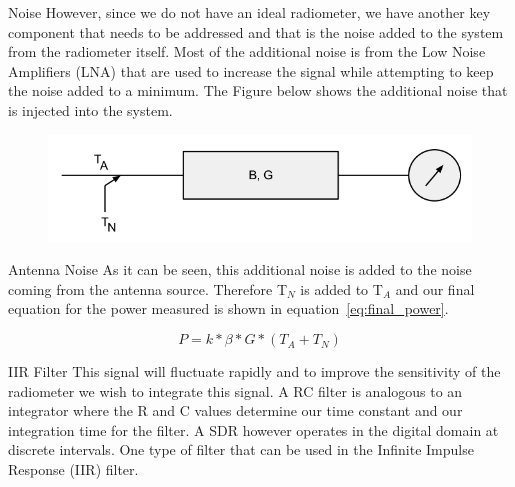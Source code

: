 \documentclass[notes]{beamer}
\begin{document}
\begin{frame}
\begin{block}{Noise}
However, since we do not have an ideal radiometer, we have another key component that needs to be addressed and that is the noise added to the system from the radiometer itself.  Most of the additional noise is from the Low Noise Amplifiers (LNA) that are used to increase the signal while attempting to keep the noise added to a minimum.  The Figure below shows the additional noise that is injected into the system.

{\begin{figure}[h!tb] 
\centering
\includegraphics[width=\textwidth]{../Images/radiometer_noise_added.png}
\label{noiserad}
\end{figure}
}
\end{block}
\end{frame}

\begin{frame}
\begin{block}{Antenna Noise}
As it can be seen, this additional noise is added to the noise coming from the antenna source.  Therefore T$_{N}$ is added to T$_{A}$ and our final equation for the power measured is shown in equation~\ref{eq:final_power}.  

\begin{equation} \label{eq:final_power}
P=k*\beta*G*(T_{A}+T_{N})
\end{equation}
\end{block}
\end{frame}

\begin{frame}
\begin{block}{IIR Filter}
This signal will fluctuate rapidly and to improve the sensitivity of the radiometer we wish to integrate this signal.  A RC filter is analogous to an integrator where the R and C values determine our time constant and our integration time for the filter.  A SDR however operates in the digital domain at discrete intervals.  One type of filter that can be used in the Infinite Impulse Response (IIR) filter. 
\end{block}
\end{frame}
\end{document}
